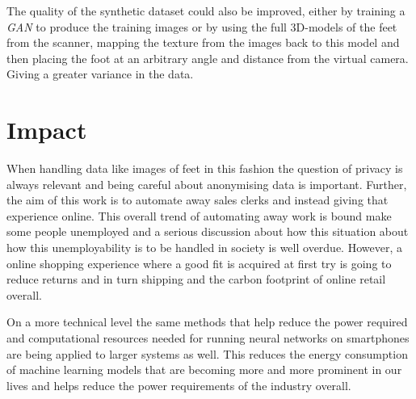 \documentclass{kththesis}
\begin{document}
The quality of the synthetic dataset could also be improved, either by training a
\textit{GAN} to produce the training images or by using the full 3D-models of
the feet from the scanner, mapping the texture from the images back to this model
and then placing the foot at an arbitrary angle and distance from the virtual
camera. Giving a greater variance in the data.

\section{Impact}
When handling data like images of feet in this fashion the question of privacy
is always relevant and being careful about anonymising data is important.
Further, the aim of this work is to automate away sales clerks and instead
giving that experience online. This overall trend of automating away work is
bound make some people unemployed and a serious discussion about how this
situation about how this unemployability is to be handled in society is well
overdue. However, a online shopping experience where a good fit is acquired at
first try is going to reduce returns and in turn shipping and the carbon
footprint of online retail overall. 

On a more technical level the same methods that help reduce the power required
and computational resources needed for running neural networks on smartphones
are being applied to larger systems as well. This reduces the energy consumption
of machine learning models that are becoming more and more prominent in our
lives and helps reduce the power requirements of the industry overall.

\printbibliography[heading=bibintoc]%


\end{document}
